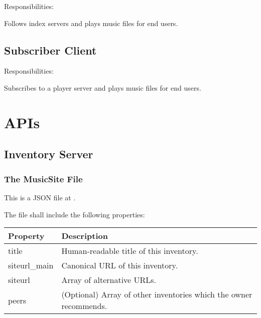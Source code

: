 \documentclass[a4paper,11pt]{article}
\begin{document}
Responsibilities:

\begin{compactitem}
	\item Follows index servers and plays music files for end users.
\end{compactitem}

\subsection{Subscriber Client}

Responsibilities:

\begin{compactitem}
	\item Subscribes to a player server and plays music files for end users.
\end{compactitem}






















\section{APIs}


\subsection{Inventory Server}

\subsubsection{The MusicSite File}

This is a JSON file at .

The file shall include the following properties:

\begin{tabu}{|l|X|}
	\hline
	{Property}      & {Description}                                                       \\
	\hline
	{title}         & {Human-readable title of this inventory.}                           \\
	{siteurl\_main} & {Canonical URL of this inventory.}                                  \\
	{siteurl}       & {Array of alternative URLs.}                                        \\
	{peers}         & {(Optional) Array of other inventories which the owner recommends.} \\
	\hline
\end{tabu}
\end{document}
